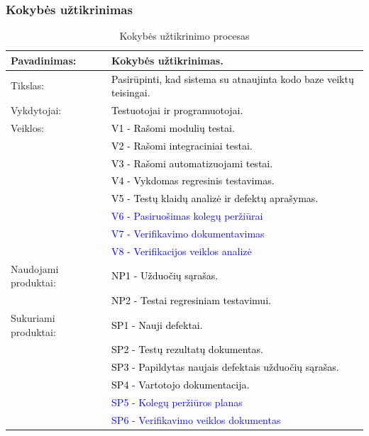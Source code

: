 \documentclass{VUMIFPSkursinis}
\begin{document}
	\subsubsection{Kokybės užtikrinimas}
	\begin{center}
		\begin{table}[ht]
			\caption{Kokybės užtikrinimo procesas}
			\begin{tabular}{ | l | l | }
				\hline
				Pavadinimas:          & Kokybės užtikrinimas.                                \\ \hline
				Tikslas:              & \textcolor{black}{Pasirūpinti, kad sistema su atnaujinta kodo baze veiktų teisingai.} \\ \hline
				Vykdytojai:	          & \textcolor{black}{Testuotojai ir programuotojai.}                       \\ \hline
				Veiklos:              & \textcolor{black}{V1 - Rašomi modulių testai.}                          \\
				                      & \textcolor{black}{V2 - Rašomi integraciniai testai.}                    \\
				                      & \textcolor{black}{V3 - Rašomi automatizuojami testai.}                  \\
				                      & \textcolor{black}{V4 - Vykdomas regresinis testavimas.}                 \\
				                      & \textcolor{black}{V5 - Testų klaidų analizė ir defektų aprašymas.}      \\ 
						      & \textcolor{blue}{V6 - Pasiruošimas kolegų peržiūrai}\\	
						      & \textcolor{blue}{V7 - Verifikavimo dokumentavimas} \\ 
						      & \textcolor{blue}{V8 - Verifikacijos veiklos analizė}\\ \hline
				Naudojami produktai:  & \textcolor{black}{NP1 - Užduočių sąrašas.}                              \\
				                      & \textcolor{black}{NP2 - Testai regresiniam testavimui.}                 \\ \hline
				Sukuriami produktai:  & \textcolor{black}{SP1 - Nauji defektai.}                                \\
				                      & \textcolor{black}{SP2 - Testų rezultatų dokumentas.}                    \\
				                      & \textcolor{black}{SP3 - Papildytas naujais defektais užduočių sąrašas.} \\
				                      & \textcolor{black}{SP4 - Vartotojo dokumentacija.}                       \\ 
						      & \textcolor{blue}{SP5 - Kolegų peržiūros planas}\\ 
						      & \textcolor{blue}{SP6 - Verifikavimo veiklos dokumentas} \\ \hline
			\end{tabular}
		\end{table}
	\end{center}
\end{document}
